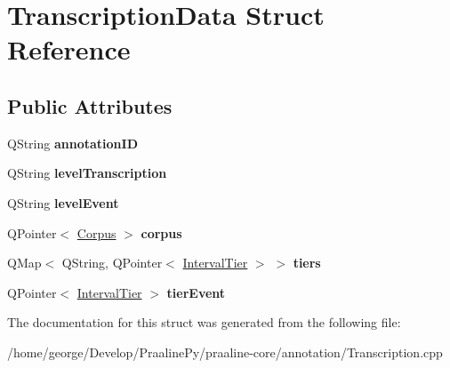 \hypertarget{struct_transcription_data}{}\section{Transcription\+Data Struct Reference}
\label{struct_transcription_data}
\subsection*{Public Attributes}
\begin{DoxyCompactItemize}
\item 
\mbox{\label{struct_transcription_data_a1adbe042124401f66225a9b2beb452fd}} 
Q\+String {\bfseries annotation\+ID}
\item 
\mbox{\label{struct_transcription_data_abcb32ef979e04a89b2b8a40087e0295d}} 
Q\+String {\bfseries level\+Transcription}
\item 
\mbox{\label{struct_transcription_data_a790fd5bd7f7c5ab4a8550961cf03b051}} 
Q\+String {\bfseries level\+Event}
\item 
\mbox{\label{struct_transcription_data_a8617fb37e96c1a47ac7c0d0503919519}} 
Q\+Pointer$<$ \hyperlink{class_corpus}{Corpus} $>$ {\bfseries corpus}
\item 
\mbox{\label{struct_transcription_data_a57c46eba1d084dc8f28ecc39f54f5034}} 
Q\+Map$<$ Q\+String, Q\+Pointer$<$ \hyperlink{class_interval_tier}{Interval\+Tier} $>$ $>$ {\bfseries tiers}
\item 
\mbox{\label{struct_transcription_data_a95c7b6bfcde584d6a94f3a1a39a9e281}} 
Q\+Pointer$<$ \hyperlink{class_interval_tier}{Interval\+Tier} $>$ {\bfseries tier\+Event}
\end{DoxyCompactItemize}


The documentation for this struct was generated from the following file\+:\begin{DoxyCompactItemize}
\item 
/home/george/\+Develop/\+Praaline\+Py/praaline-\/core/annotation/Transcription.\+cpp\end{DoxyCompactItemize}
